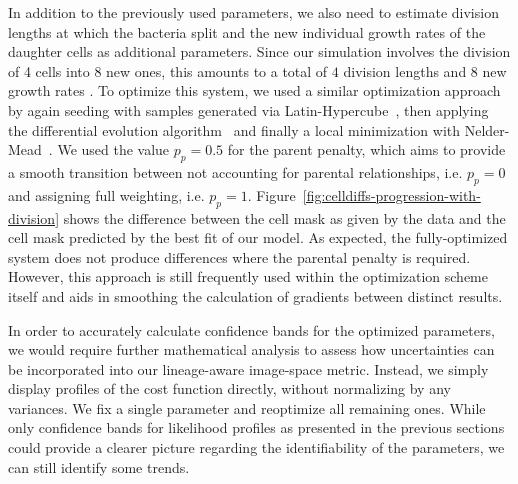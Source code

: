 In addition to the previously used parameters, we also need to estimate division lengths at
which the bacteria split and the new individual growth rates of the daughter cells as additional
parameters.
Since our simulation involves the division of 4 cells into 8 new ones, this amounts to a total of
$4$ division lengths and $8$ new growth rates .
To optimize this system, we used a similar optimization approach by again seeding with samples
generated via Latin-Hypercube~\cite{McKay1979}, then applying the differential evolution
algorithm~\cite{Storn1997} and finally a local minimization with Nelder-Mead~\cite{Gao2010}.
We used the value $p_p=0.5$ for the parent penalty, which aims to provide a smooth transition
between not accounting for parental relationships, i.e. $p_p=0$ and assigning full weighting, i.e.
$p_p=1$.
Figure~\ref{fig:celldiffs-progression-with-division} shows the difference between the cell mask as
given by the data and the cell mask predicted by the best fit of our model.
As expected, the fully-optimized system does not produce differences where the parental penalty is
required.
However, this approach is still frequently used within the optimization scheme itself and aids
in smoothing the calculation of gradients between distinct results.

In order to accurately calculate confidence bands for the optimized parameters, we would require
further mathematical analysis to assess how uncertainties can be incorporated into our lineage-aware
image-space metric.
Instead, we simply display profiles of the cost function directly, without normalizing by any
variances.
We fix a single parameter and reoptimize all remaining ones.
While only confidence bands for likelihood profiles as presented in the previous sections could
provide a clearer picture regarding the identifiability of the parameters, we can still
identify some trends.

